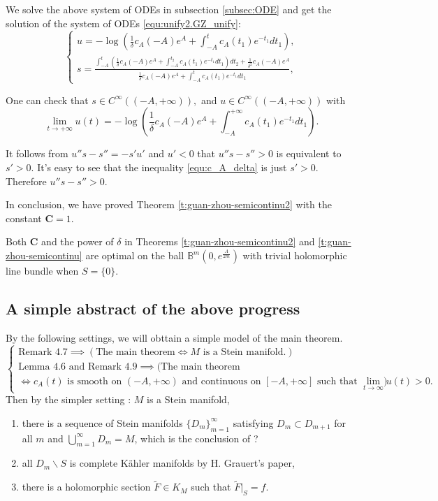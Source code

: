 We solve the above system of ODEs in subsection \ref{subsec:ODE} and
get the solution of the system of ODEs \ref{equ:unify2.GZ_unify}:
\begin{equation}
\begin{cases}
u=-\log(\frac{1}{\delta}c_{A}(-A)e^{A}+\int_{-A}^{t}c_{A}(t_{1})e^{-t_{1}}dt_{1}),
\\
s=\frac{\int_{-A}^{t}(\frac{1}{\delta}c_{A}(-A)e^{A}+\int_{-A}^{t_{2}}c_{A}
(t_{1})e^{-t_{1}}dt_{1})dt_{2}+\frac{1}{\delta^{2}}c_{A}(-A)e^{A}}
{\frac{1}{\delta}c_{A}(-A)e^{A}+\int_{-A}^{t}c_{A}(t_{1})e^{-t_{1}}dt_{1}},
\end{cases}
\end{equation}

One can check that $s\in C^{\infty}((-A,+\infty)),$ and $u\in
C^{\infty}((-A,+\infty))$ with
$$\lim_{t\to+\infty}u(t)=-\log(\frac{1}{\delta}c_{A}(-A)e^{A}+\int_{-A}^{+\infty}c_{A}(t_{1})e^{-t_{1}}dt_{1}).$$

It follows from $u''s-s''=-s'u'$ and $u'<0$ that $u''s-s''>0$ is
equivalent to $s'>0$. It's easy to see that the inequality
\ref{equ:c_A_delta} is just $s'>0$. Therefore $u''s-s''>0$.

In conclusion, we have proved Theorem \ref{t:guan-zhou-semicontinu2}
with the constant $\mathbf{C}=1$.

\begin{Remark}\label{r:guan-zhou-unify-exa2}
Both $\mathbf{C}$ and the power of $\delta$ in Theorems
\ref{t:guan-zhou-semicontinu2} and \ref{t:guan-zhou-semicontinu} are
optimal on the ball $\mathbb{B}^{m}(0,e^{\frac{A}{2m}})$ with
trivial holomorphic line bundle when $S=\{0\}$.
\end{Remark}
\subsection{A simple abstract of the above progress}

By the following settings, we will obttain a simple model of the main theorem. 
\[
  \begin{cases}
    \text{Remark 4.7} \implies (\text{The main theorem} \iff  \text{$M$ is a Stein manifold.})\\ 
    \text{Lemma 4.6 and Remark 4.9} \implies (\text{The main theorem} \\\iff  \text{$c_A(t)$ is smooth on $(-A,+\infty)$ and continuous on $[-A,+\infty]$ such that $\lim_{t\to\infty}u(t)>0$.})
  \end{cases}
\]
Then by the simpler setting : $M$ is a Stein manifold, 
\begin{enumerate}
  \item there is a sequence of Stein manifolds $\{D_m\}_{m=1}^\infty$ satisfying $D_m\subset D_{m+1}$ for all $m$ and $\bigcup_{m=1}^\infty D_{m}=M$, which is the conclusion of ?
  \item all $D_m\backslash S$ is complete K\"ahler manifolds by H. Grauert's paper,
  \item there is a holomorphic section $\widetilde{F}\in K_M$ such that $\widetilde{F}|_S=f$.
\end{enumerate}

